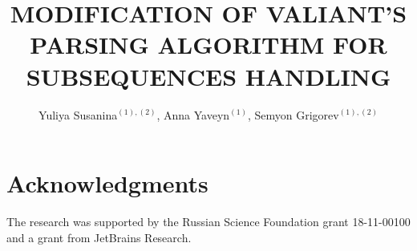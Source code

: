 \documentclass[12pt,a4paper]{cibb}
\title{\large $\ $\\ \bf MODIFICATION OF VALIANT'S PARSING ALGORITHM FOR SUBSEQUENCES HANDLING}
\author{Yuliya Susanina$^{(1),(2)}$, Anna Yaveyn$^{(1)}$, Semyon Grigorev$^{(1),(2)}$}
\begin{document}
\thispagestyle{myheadings}
\pagestyle{myheadings}







\section*{\bf Acknowledgments}

The research was supported by the Russian Science Foundation grant 18-11-00100 and a grant from JetBrains Research.


%


{\fontsize{10}{10}\selectfont
\setlength{\parskip}{0pt}



}
\end{document}

